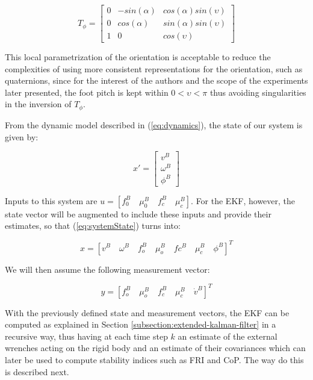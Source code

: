 \documentclass[letterpaper, 10 pt, conference]{ieeeconf}  %
\begin{document}
\begin{equation}
T_{\phi} = \left[ \begin{array}{ccc}
                    0  &  -sin(\alpha)  &  cos(\alpha)sin(\upsilon)\\
                    0  &   cos(\alpha)  &  sin(\alpha)sin(\upsilon)\\
                    1  &       0        &  cos(\upsilon)                    
                   \end{array} \right]
\end{equation}

This local parametrization of the orientation is acceptable to reduce the complexities of using more consistent representations for the orientation, such as quaternions, since for the interest of the authors and the scope of the experiments later presented, the foot pitch is kept within $0<\upsilon<\pi$ thus avoiding singularities in the inversion of $T_{\phi}$.

From the dynamic model described in (\ref{eq:dynamics}), the state of our system is given by:

\begin{equation}
 x' = \left[ \begin{array}{c}
      v^B\\
      \omega^B\\
      \phi^B
     \end{array} \right]
     \label{eq:systemState}
\end{equation}

Inputs to this system are $u = [f_0^B \quad \mu_0^B \quad f_c^B \quad \mu_c^B]$. For the EKF, however, the state vector will be augmented to include these inputs and provide their estimates, so that (\ref{eq:systemState}) turns into: 

\begin{equation}
 x = [ v^B \quad \omega^B \quad f_o^B \quad \mu_o^B \quad fc^B \quad \mu_c^B \quad \phi^B]^T 
\end{equation}

We will then assume the following measurement vector:

\begin{equation}
  y = [f_o^B \quad \mu_o^B \quad f_c^B  \quad \mu_c^B \quad \dot{v}^B]^T 
\end{equation}

With the previously defined state and measurement vectors, the EKF can be computed as explained in Section \ref{subsection:extended-kalman-filter} in a recursive way, thus having at each time step $k$ an estimate of the external wrenches acting on the rigid body and an estimate of their covariances which can later be used to compute stability indices such as FRI and CoP. The way do this is described next. 
\end{document}
